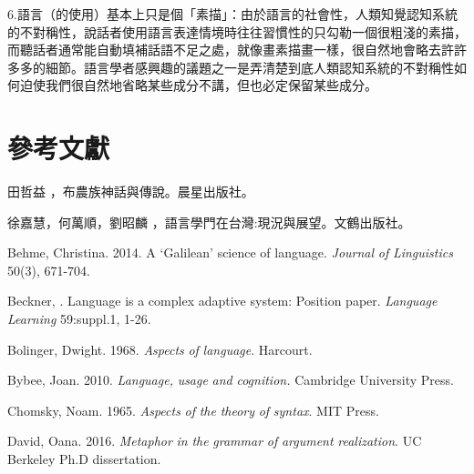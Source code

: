 6.語言（的使用）基本上只是個「素描」：由於語言的社會性，人類知覺認知系統的不對稱性，說話者使用語言表達情境時往往習慣性的只勾勒一個很粗淺的素描，而聽話者通常能自動填補話語不足之處，就像畫素描畫一樣，很自然地會略去許許多多的細節。語言學者感興趣的議題之一是弄清楚到底人類認知系統的不對稱性如何迫使我們很自然地省略某些成分不講，但也必定保留某些成分。  

\section{參考文獻}  %
\begin{stylereferences}
田哲益 ，布農族神話與傳說。晨星出版社。
\end{stylereferences}

\begin{stylereferences}
徐嘉慧，何萬順，劉昭麟 ，語言學門在台灣:現況與展望。文鶴出版社。
\end{stylereferences}

\begin{stylereferences}
Behme, Christina. 2014. A ‘Galilean’ science of language. \textit{Journal} \textit{of} \textit{Linguistics} 50(3), 671-704.
\end{stylereferences}

\begin{stylereferences}
Beckner, \citealt{ClayEtAl2009}. Language is a complex adaptive system: Position paper. \textit{Language} \textit{Learning} 59:suppl.1, 1-26.
\end{stylereferences}

\begin{stylereferences}
Bolinger, Dwight. 1968. \textit{Aspects} \textit{of} \textit{language}. Harcourt. 
\end{stylereferences}

\begin{stylereferences}
Bybee, Joan. 2010. \textit{Language,} \textit{usage} \textit{and} \textit{cognition.} Cambridge University Press.
\end{stylereferences}

\begin{stylereferences}
Chomsky, Noam. 1965. \textit{Aspects} \textit{of} \textit{the} \textit{theory} \textit{of} \textit{syntax}. MIT Press. 
\end{stylereferences}

\begin{stylereferences}
David, Oana. 2016. \textit{Metaphor} \textit{in} \textit{the} \textit{grammar} \textit{of} \textit{argument} \textit{realization}. UC Berkeley Ph.D dissertation. 
\end{stylereferences}

